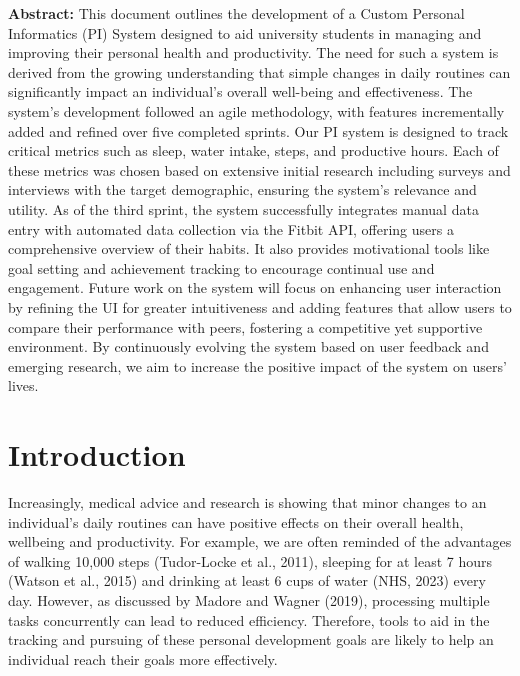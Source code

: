 \documentclass[11pt]{article}
\begin{document}
\begin{titlepage}
\begin{minipage}{0.8\textwidth}
        \normalsize\textbf{Abstract:} This document outlines the development of
        a Custom Personal Informatics (PI) System designed to aid university
        students in managing and improving their personal health and
        productivity. The need for such a system is derived from the growing
        understanding that simple changes in daily routines can significantly
        impact an individual's overall well-being and effectiveness. The
        system's development followed an agile methodology, with features
        incrementally added and refined over five completed sprints. Our PI
        system is designed to track critical metrics such as sleep, water
        intake, steps, and productive hours. Each of these metrics was chosen
        based on extensive initial research including surveys and interviews
        with the target demographic, ensuring the system's relevance and
        utility. As of the third sprint, the system successfully integrates
        manual data entry with automated data collection via the Fitbit API,
        offering users a comprehensive overview of their habits. It also
        provides motivational tools like goal setting and achievement tracking
        to encourage continual use and engagement. Future work on the system
        will focus on enhancing user interaction by refining the UI for greater
        intuitiveness and adding features that allow users to compare their
        performance with peers, fostering a competitive yet supportive
        environment. By continuously evolving the system based on user feedback
        and emerging research, we aim to increase the positive impact of the
        system on users' lives.


    \end{minipage}

    \vfill
\end{titlepage}
\thispagestyle{fancy}

\newpage

\tableofcontents
\thispagestyle{empty}

\newpage

\setcounter{page}{1}


\section{Introduction}

Increasingly, medical advice and research is showing that minor changes to an
individual’s daily routines can have positive effects on their overall health,
wellbeing and productivity. For example, we are often reminded of the
advantages of walking 10,000 steps (Tudor-Locke et al., 2011), sleeping for at
least 7 hours (Watson et al., 2015) and drinking at least 6 cups of water (NHS,
2023) every day. However, as discussed by Madore and Wagner (2019), processing
multiple tasks concurrently can lead to reduced efficiency. Therefore, tools to
aid in the tracking and pursuing of these personal development goals are likely
to help an individual reach their goals more effectively.\par
\end{document}
